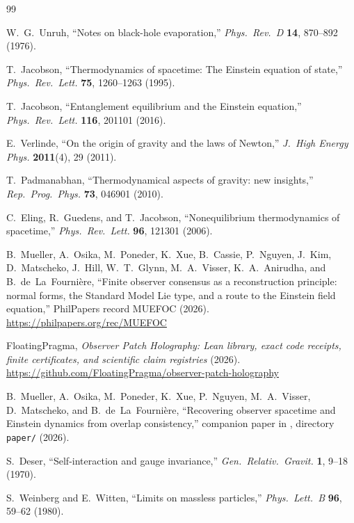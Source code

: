 \documentclass[12pt]{article}
\begin{document}
\clearpage
\begin{singlespace}
\begin{thebibliography}{99}
\small

W.~G.~Unruh, ``Notes on black-hole evaporation,'' \emph{Phys.\ Rev.\ D} \textbf{14}, 870--892 (1976).

T.~Jacobson, ``Thermodynamics of spacetime: The Einstein equation of state,'' \emph{Phys.\ Rev.\ Lett.} \textbf{75}, 1260--1263 (1995).

T.~Jacobson, ``Entanglement equilibrium and the Einstein equation,'' \emph{Phys.\ Rev.\ Lett.} \textbf{116}, 201101 (2016).

E.~Verlinde, ``On the origin of gravity and the laws of Newton,'' \emph{J.\ High Energy Phys.} \textbf{2011}(4), 29 (2011).

T.~Padmanabhan, ``Thermodynamical aspects of gravity: new insights,'' \emph{Rep.\ Prog.\ Phys.} \textbf{73}, 046901 (2010).

C.~Eling, R.~Guedens, and T.~Jacobson, ``Nonequilibrium thermodynamics of spacetime,'' \emph{Phys.\ Rev.\ Lett.} \textbf{96}, 121301 (2006).

B.~Mueller, A.~Osika, M.~Poneder, K.~Xue, B.~Cassie, P.~Nguyen, J.~Kim, D.~Matscheko, J.~Hill, W.~T.~Glynn, M.~A.~Visser, K.~A.~Anirudha, and B.~de~La~Fourni\`ere, ``Finite observer consensus as a reconstruction principle: normal forms, the Standard Model Lie type, and a route to the Einstein field equation,'' PhilPapers record MUEFOC (2026). \url{https://philpapers.org/rec/MUEFOC}

FloatingPragma, \emph{Observer Patch Holography: Lean library, exact code receipts, finite certificates, and scientific claim registries} (2026). \url{https://github.com/FloatingPragma/observer-patch-holography}

B.~Mueller, A.~Osika, M.~Poneder, K.~Xue, P.~Nguyen, M.~A.~Visser, D.~Matscheko, and B.~de~La~Fourni\`ere, ``Recovering observer spacetime and Einstein dynamics from overlap consistency,'' companion paper in \cite{ophrepo}, directory \texttt{paper/} (2026).

S.~Deser, ``Self-interaction and gauge invariance,'' \emph{Gen.\ Relativ.\ Gravit.} \textbf{1}, 9--18 (1970).

S.~Weinberg and E.~Witten, ``Limits on massless particles,'' \emph{Phys.\ Lett.\ B} \textbf{96}, 59--62 (1980).


\end{thebibliography}
\end{singlespace}
\end{document}
